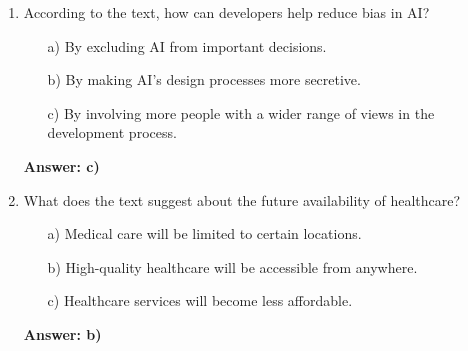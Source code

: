 \documentclass[12pt]{article}
\begin{document}
\begin{enumerate}[label=\textbf{01.}]
    \item According to the text, how can developers help reduce bias in AI?
    \begin{itemize}
        \item[a)] By excluding AI from important decisions.
        \item[b)] By making AI’s design processes more secretive.
        \item[c)] By involving more people with a wider range of views in the development process.
    \end{itemize}
    \textbf{Answer: c)} 
    
    \item What does the text suggest about the future availability of healthcare?
    \begin{itemize}
        \item[a)] Medical care will be limited to certain locations.
        \item[b)] High-quality healthcare will be accessible from anywhere.
        \item[c)] Healthcare services will become less affordable.
    \end{itemize}
    \textbf{Answer: b)}
\end{enumerate}
\end{document}
